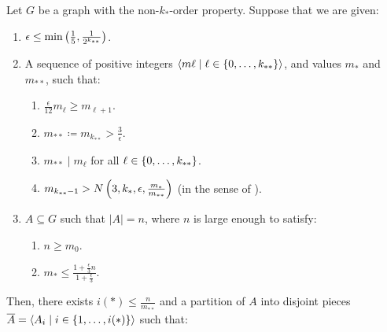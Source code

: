    \begin{lemma}[Corollary 5.15] \label{lem:resume_of_all_conditions_for_excellent_partitions}
        Let $G$ be a graph with the non-$k_{*}$-order property.
        Suppose that we are given:
        \begin{enumerate}
            \item $\epsilon \leq \min \left( \frac{1}{5}, \frac{1}{2^{k_{**}}} \right)$.
            \item A sequence of positive integers $\left< m\ell \mid \ell \in \left\{ 0, \dots, k_{**} \right\} \right>$, and values $m_*$
                and $m_{**}$, such that:
                \begin{enumerate}[label=(\alph*), ref=2.\alph*]
                    \item \label{itm:resume_of_all_conditions_for_excellent_partitions.a} $\frac{\epsilon}{12} m_\ell \geq m_{\ell + 1}$.
                    \item \label{itm:resume_of_all_conditions_for_excellent_partitions.b} $m_{**} \coloneq m_{k_{**}} > \frac{3}{\epsilon}$.
                    \item \label{itm:resume_of_all_conditions_for_excellent_partitions.c} $m_{**} \mid m_\ell$ for all $\ell \in \left\{ 0, \dots, k_{**} \right\}$.
                    \item \label{itm:resume_of_all_conditions_for_excellent_partitions.d} $m_{k_{**}-1} > N\left( 3, k_*, \epsilon, \frac{m_*}{m_{**}} \right)$ (in the sense
                        of ).
            \end{enumerate}
            \item $A \subseteq G$ such that $|A| = n$, where $n$ is large enough to satisfy:
            \begin{enumerate}[label=(\alph*'), ref=3.\alph*]
                \item \label{itm:resume_of_all_conditions_for_excellent_partitions.a'} $n \geq m_0$. 
                \item \label{itm:resume_of_all_conditions_for_excellent_partitions.b'} $m_* \leq \frac{1 + \frac{\epsilon}{3}n}{1 + \frac{\epsilon}{3}}$.
            \end{enumerate}
        \end{enumerate}
        Then, there exists $i(*) \leq \frac{n}{m_{**}}$ and a partition of $A$ into disjoint pieces
        $\overline{A} = \left< A_i \mid i \in \left\{ 1, \dots, i(*) \right\} \right>$ such that:
        \begin{enumerate}[label=(\roman*), ref=\roman*]

\end{enumerate}
\end{lemma}
